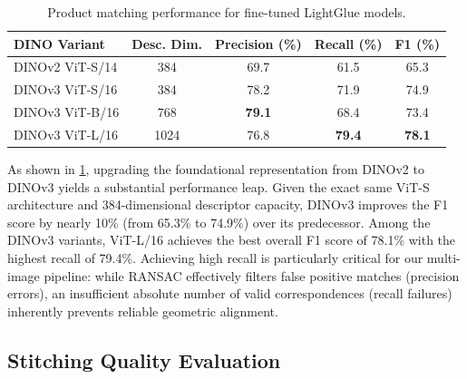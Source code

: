 \documentclass[10pt,twocolumn,letterpaper]{article}
\begin{document}
\begin{table}[htbp]
\centering
\caption{Product matching performance for fine-tuned LightGlue models.}
\label{tab:matching_results}
\scriptsize 
\begin{tabular}{lcccc}
\toprule
\textbf{DINO Variant} & \textbf{Desc. Dim.} & \textbf{Precision (\%)} & \textbf{Recall (\%)} & \textbf{F1 (\%)} \\
\midrule
DINOv2 ViT-S/14 & 384  & 69.7 & 61.5 & 65.3 \\
DINOv3 ViT-S/16 & 384  & 78.2 & 71.9 & 74.9 \\
DINOv3 ViT-B/16 & 768  & \textbf{79.1} & 68.4 & 73.4 \\
DINOv3 ViT-L/16 & 1024 & 76.8 & \textbf{79.4} & \textbf{78.1} \\
\bottomrule
\end{tabular}
\end{table}



As shown in \cref{tab:matching_results}, upgrading the foundational representation from DINOv2 to DINOv3 yields a substantial performance leap. Given the exact same ViT-S architecture and 384-dimensional descriptor capacity, DINOv3 improves the F1 score by nearly 10\% (from 65.3\% to 74.9\%) over its predecessor. Among the DINOv3 variants, ViT-L/16 achieves the best overall F1 score of 78.1\% with the highest recall of 79.4\%. Achieving high recall is particularly critical for our multi-image pipeline: while RANSAC effectively filters false positive matches (precision errors), an insufficient absolute number of valid correspondences (recall failures) inherently prevents reliable geometric alignment.


\subsection{Stitching Quality Evaluation}
\label{subsec:stitching_quality}
\end{document}
